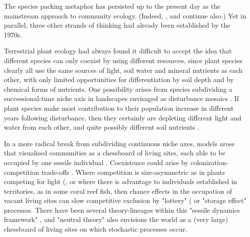 \documentclass[a4paper,11pt]{article}
\begin{document}

The species packing metaphor has persisted up to the present day as the mainstream approach to community ecology. (Indeed,  \citet{Krebs-2013}, \citet{Ricklefs-1999} and \citet{Pianka-1999} continue also.) Yet in parallel, three other strands of thinking had already been established by the 1970s.

Terrestrial plant ecology had always found it difficult to accept the idea that different species can only coexist by using different resources, since plant species clearly all use the same sources of light, soil water and mineral nutrients as each other, with only limited opportunities for differentiation by soil depth and by chemical forms of nutrients. One possibility arises from species subdividing a successional-time niche axis in landscapes envisaged as disturbance mosaics \citep{Connell-1978}. If plant species make most contribution to their population increase in different years following disturbance, then they certainly are depleting different light and water from each other, and quite possibly different soil nutrients \citep{Huston-1987, Kohyama-1993}.

In a more radical break from subdividing continuous niche axes, models arose that visualised communities as a chessboard of living sites, each able to be occupied by one sessile individual \citep{Yodzis-1978}. Coexistence could arise by colonization-competition trade-offs \citep{Levins-1969,Levins-1971}. Where competition is size-asymmetric as in plants competing for light (\citep{Harper-1977,Weiner-1990}, or where there is advantage to individuals established in territories, as in some coral reef fish, then chance effects in the occupation of vacant living sites can slow competitive exclusion by "lottery" \citep{Sale-1977}( or "storage effect" \citep{Chesson-1981} processes. There have been several theory-lineages within this "sessile dynamics framework" \citep{Fagerstrom-1997}, and "neutral theory" \citep{Hubbell-2001} also envisions the world as a (very large) chessboard of living sites on which stochastic processes occur.
\end{document}
